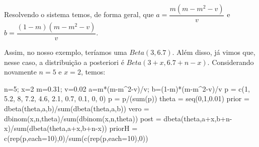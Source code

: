 \documentclass[
]{book}
\newenvironment{Shaded}{\begin{snugshade}}{\end{snugshade}}
\newcommand{\AttributeTok}[1]{\textcolor[rgb]{0.77,0.63,0.00}{#1}}
\newcommand{\DecValTok}[1]{\textcolor[rgb]{0.00,0.00,0.81}{#1}}
\newcommand{\FloatTok}[1]{\textcolor[rgb]{0.00,0.00,0.81}{#1}}
\newcommand{\FunctionTok}[1]{\textcolor[rgb]{0.00,0.00,0.00}{#1}}
\newcommand{\NormalTok}[1]{#1}
\newcommand{\OtherTok}[1]{\textcolor[rgb]{0.56,0.35,0.01}{#1}}
\newcommand{\SpecialCharTok}[1]{\textcolor[rgb]{0.00,0.00,0.00}{#1}}
\begin{document}
Resolvendo o sistema temos, de forma geral, que \(a=\dfrac{m(m-m^2-v)}{v}\) e \(b=\dfrac{(1-m)(m-m^2-v)}{v}\).

Assim, no nosso exemplo, teríamos uma \(Beta(3,6.7)\). Além disso, já vimos que, nesse caso, a distribuição a posteriori é \(Beta(3+x,6.7+n-x)\). Considerando novamente \(n=5\) e \(x=2\), temos:

\begin{Shaded}
\begin{Highlighting}[]
\NormalTok{n}\OtherTok{=}\DecValTok{5}\NormalTok{; x}\OtherTok{=}\DecValTok{2}
\NormalTok{m}\OtherTok{=}\FloatTok{0.31}\NormalTok{; v}\OtherTok{=}\FloatTok{0.02}
\NormalTok{a}\OtherTok{=}\NormalTok{m}\SpecialCharTok{*}\NormalTok{(m}\SpecialCharTok{{-}}\NormalTok{m}\SpecialCharTok{\^{}}\DecValTok{2}\SpecialCharTok{{-}}\NormalTok{v)}\SpecialCharTok{/}\NormalTok{v; b}\OtherTok{=}\NormalTok{(}\DecValTok{1}\SpecialCharTok{{-}}\NormalTok{m)}\SpecialCharTok{*}\NormalTok{(m}\SpecialCharTok{{-}}\NormalTok{m}\SpecialCharTok{\^{}}\DecValTok{2}\SpecialCharTok{{-}}\NormalTok{v)}\SpecialCharTok{/}\NormalTok{v}
\NormalTok{p }\OtherTok{=} \FunctionTok{c}\NormalTok{(}\DecValTok{1}\NormalTok{, }\FloatTok{5.2}\NormalTok{, }\DecValTok{8}\NormalTok{, }\FloatTok{7.2}\NormalTok{, }\FloatTok{4.6}\NormalTok{, }\FloatTok{2.1}\NormalTok{, }\FloatTok{0.7}\NormalTok{, }\FloatTok{0.1}\NormalTok{, }\DecValTok{0}\NormalTok{, }\DecValTok{0}\NormalTok{)}
\NormalTok{p }\OtherTok{=}\NormalTok{ p}\SpecialCharTok{/}\NormalTok{(}\FunctionTok{sum}\NormalTok{(p))}
\NormalTok{theta }\OtherTok{=} \FunctionTok{seq}\NormalTok{(}\DecValTok{0}\NormalTok{,}\DecValTok{1}\NormalTok{,}\FloatTok{0.01}\NormalTok{)}
\NormalTok{prior }\OtherTok{=} \FunctionTok{dbeta}\NormalTok{(theta,a,b)}\SpecialCharTok{/}\FunctionTok{sum}\NormalTok{(}\FunctionTok{dbeta}\NormalTok{(theta,a,b))}
\NormalTok{vero }\OtherTok{=} \FunctionTok{dbinom}\NormalTok{(x,n,theta)}\SpecialCharTok{/}\FunctionTok{sum}\NormalTok{(}\FunctionTok{dbinom}\NormalTok{(x,n,theta))}
\NormalTok{post }\OtherTok{=} \FunctionTok{dbeta}\NormalTok{(theta,a}\SpecialCharTok{+}\NormalTok{x,b}\SpecialCharTok{+}\NormalTok{n}\SpecialCharTok{{-}}\NormalTok{x)}\SpecialCharTok{/}\FunctionTok{sum}\NormalTok{(}\FunctionTok{dbeta}\NormalTok{(theta,a}\SpecialCharTok{+}\NormalTok{x,b}\SpecialCharTok{+}\NormalTok{n}\SpecialCharTok{{-}}\NormalTok{x))}
\NormalTok{priorH }\OtherTok{=} \FunctionTok{c}\NormalTok{(}\FunctionTok{rep}\NormalTok{(p,}\AttributeTok{each=}\DecValTok{10}\NormalTok{),}\DecValTok{0}\NormalTok{)}\SpecialCharTok{/}\FunctionTok{sum}\NormalTok{(}\FunctionTok{c}\NormalTok{(}\FunctionTok{rep}\NormalTok{(p,}\AttributeTok{each=}\DecValTok{10}\NormalTok{),}\DecValTok{0}\NormalTok{))}

\end{Highlighting}
\end{Shaded}
\end{document}

